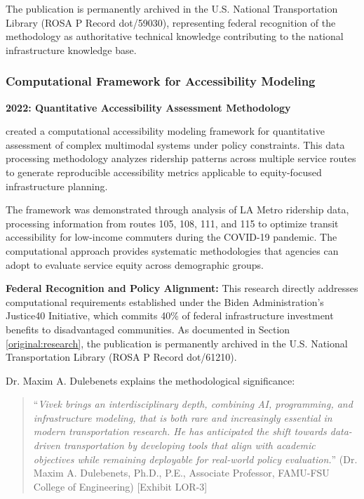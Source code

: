 The publication is permanently archived in the U.S. National Transportation Library (ROSA P Record dot/59030), representing federal recognition of the methodology as authoritative technical knowledge contributing to the national infrastructure knowledge base.


\subsubsection{Computational Framework for Accessibility Modeling}
\label{scholar:equity}

\textbf{2022: Quantitative Accessibility Assessment Methodology}

\dr created a computational accessibility modeling framework for quantitative assessment of complex multimodal systems under policy constraints. This data processing methodology analyzes ridership patterns across multiple service routes to generate reproducible accessibility metrics applicable to equity-focused infrastructure planning.

The framework was demonstrated through analysis of LA Metro ridership data, processing information from routes 105, 108, 111, and 115 to optimize transit accessibility for low-income commuters during the COVID-19 pandemic. The computational approach provides systematic methodologies that agencies can adopt to evaluate service equity across demographic groups.

\textbf{Federal Recognition and Policy Alignment:} This research directly addresses computational requirements established under the Biden Administration's Justice40 Initiative, which commits 40\% of federal infrastructure investment benefits to disadvantaged communities. As documented in Section \ref{original:research}, the publication is permanently archived in the U.S. National Transportation Library (ROSA P Record dot/61210).

Dr. Maxim A. Dulebenets explains the methodological significance:

\begin{quote}
``\textit{Vivek brings an interdisciplinary depth, combining AI, programming, and infrastructure modeling, that is both rare and increasingly essential in modern transportation research. He has anticipated the shift towards data-driven transportation by developing tools that align with academic objectives while remaining deployable for real-world policy evaluation.}'' (Dr. Maxim A. Dulebenets, Ph.D., P.E., Associate Professor, FAMU-FSU College of Engineering) [Exhibit LOR-3]
\end{quote}

